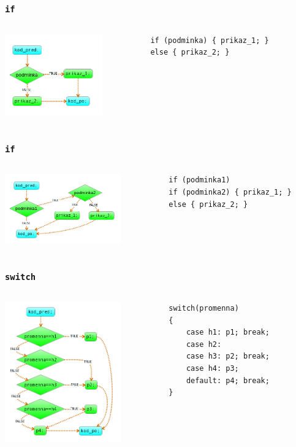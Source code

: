 \begin{frame}[fragile]
	\frametitle{\texttt{if}}
	\begin{columns}
	\column{50mm}
		\includegraphics[height=35mm]{img/if.png}
	\column{6cm}
		\begin{verbatim}
		if (podminka) { prikaz_1; }
		else { prikaz_2; }
		\end{verbatim}
	\end{columns}
\end{frame}

\begin{frame}[fragile]
	\frametitle{\texttt{if}}
	\begin{columns}
	\column{50mm}
		\includegraphics[width=50mm]{img/if_if.png}
	\column{6cm}
		\begin{verbatim}
		if (podminka1)
		if (podminka2) { prikaz_1; }
		else { prikaz_2; }
		\end{verbatim}
	\end{columns}
\end{frame}

\begin{frame}[fragile]
	\frametitle{\texttt{switch}}
	\begin{columns}
	\column{50mm}
		\includegraphics[width=50mm]{img/switch.png}
	\column{6cm}
		\begin{verbatim}
		switch(promenna)
		{
		    case h1: p1; break;
		    case h2:
		    case h3: p2; break;
		    case h4: p3;
		    default: p4; break;
		}
		\end{verbatim}
	\end{columns}
\end{frame}

